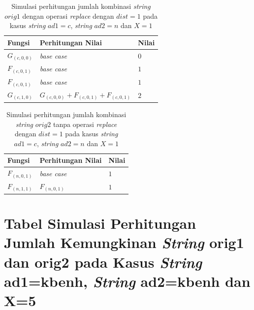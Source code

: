\begin{appendices}
  \begin{table}[H]
  	\centering
  	\begin{tabular} {|p{3cm}|p{5cm}|p{1cm}|} \hline
  		Fungsi & Perhitungan Nilai & Nilai \\ \hline
  		$ G_{(c, 0, 0)} $ & \textit{base case} & $ 0 $ \\ \hline
  		$ F_{(c, 0, 1)} $ & \textit{base case} & $ 1 $ \\ \hline
  		$ F_{(c, 0, 1)} $ & \textit{base case} & $ 1 $ \\ \hline
  		\rowcolor{LightCyan}
  		$ G_{(c, 1, 0)}  $ & $G_{(c, 0, 0)} + F_{(c, 0, 1)} + F_{(c, 0, 1)}$ & $ 2 $ \\ \hline
  	\end{tabular}\caption{Simulasi perhitungan jumlah kombinasi \textit{string} $ orig1 $ dengan operasi \textit{replace} dengan $ dist= 1  $ pada kasus \textit{string} $ ad1=c $, \textit{string} $ ad2=n $ dan $ X=1 $}
  	\label{tab:g_2_orig1_1_1}
  \end{table}
  
  \begin{table}[H]
  	\centering
  	\begin{tabular} {|p{3cm}|p{5cm}|p{1cm}|} \hline
  		Fungsi & Perhitungan Nilai & Nilai \\ \hline
  		$ F_{(n, 0, 1)} $ & \textit{base case} & $ 1 $ \\ \hline
  		\rowcolor{LightCyan}
  		$ F_{(n, 1, 1)}  $ & $F_{(n, 0, 1)}$ & $ 1 $ \\ \hline
  	\end{tabular}\caption{Simulasi perhitungan jumlah kombinasi \textit{string} $ orig2 $ tanpa operasi \textit{replace} dengan $ dist= 1  $ pada kasus \textit{string} $ ad1=c $, \textit{string} $ ad2=n $ dan $ X=1 $}
  	\label{tab:f_2_orig2_1_1}
  \end{table}
  
  \chapter{Tabel Simulasi Perhitungan Jumlah Kemungkinan \textit{String} orig1 dan orig2 pada Kasus \textit{String} ad1=kbenh, \textit{String} ad2=kbenh dan X=5}
  \setcounter{table}{0}
  \renewcommand{\thetable}{D.\arabic{table}}
  \renewcommand{\thefigure}{D.\arabic{figure}}
  
  

\end{appendices}
